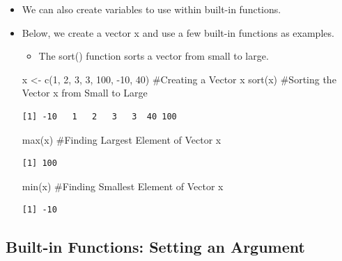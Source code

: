 \documentclass[
  letterpaper,
  DIV=11,
  numbers=noendperiod]{scrreprt}
\newenvironment{Shaded}{\begin{snugshade}}{\end{snugshade}}
\newcommand{\CommentTok}[1]{\textcolor[rgb]{0.37,0.37,0.37}{#1}}
\newcommand{\DecValTok}[1]{\textcolor[rgb]{0.68,0.00,0.00}{#1}}
\newcommand{\FunctionTok}[1]{\textcolor[rgb]{0.28,0.35,0.67}{#1}}
\newcommand{\NormalTok}[1]{\textcolor[rgb]{0.00,0.23,0.31}{#1}}
\newcommand{\OtherTok}[1]{\textcolor[rgb]{0.00,0.23,0.31}{#1}}
\newcommand{\SpecialCharTok}[1]{\textcolor[rgb]{0.37,0.37,0.37}{#1}}
\providecommand{\tightlist}{%
  \setlength{\itemsep}{0pt}\setlength{\parskip}{0pt}}\usepackage{longtable,booktabs,array}
\begin{document}
\begin{itemize}
\item
  We can also create variables to use within built-in functions.
\item
  Below, we create a vector x and use a few built-in functions as
  examples.

  \begin{itemize}
  \tightlist
  \item
    The sort() function sorts a vector from small to large.
  \end{itemize}

\begin{Shaded}
\begin{Highlighting}[]
\NormalTok{x }\OtherTok{\textless{}{-}} \FunctionTok{c}\NormalTok{(}\DecValTok{1}\NormalTok{, }\DecValTok{2}\NormalTok{, }\DecValTok{3}\NormalTok{, }\DecValTok{3}\NormalTok{, }\DecValTok{100}\NormalTok{, }\SpecialCharTok{{-}}\DecValTok{10}\NormalTok{, }\DecValTok{40}\NormalTok{)  }\CommentTok{\#Creating a Vector x}
\FunctionTok{sort}\NormalTok{(x)  }\CommentTok{\#Sorting the Vector x from Small to Large}
\end{Highlighting}
\end{Shaded}

\begin{verbatim}
[1] -10   1   2   3   3  40 100
\end{verbatim}

\begin{Shaded}
\begin{Highlighting}[]
\FunctionTok{max}\NormalTok{(x)  }\CommentTok{\#Finding Largest Element of Vector x}
\end{Highlighting}
\end{Shaded}

\begin{verbatim}
[1] 100
\end{verbatim}

\begin{Shaded}
\begin{Highlighting}[]
\FunctionTok{min}\NormalTok{(x)  }\CommentTok{\#Finding Smallest Element of Vector x}
\end{Highlighting}
\end{Shaded}

\begin{verbatim}
[1] -10
\end{verbatim}
\end{itemize}

\subsection{Built-in Functions: Setting an
Argument}\label{built-in-functions-setting-an-argument}
\end{document}

